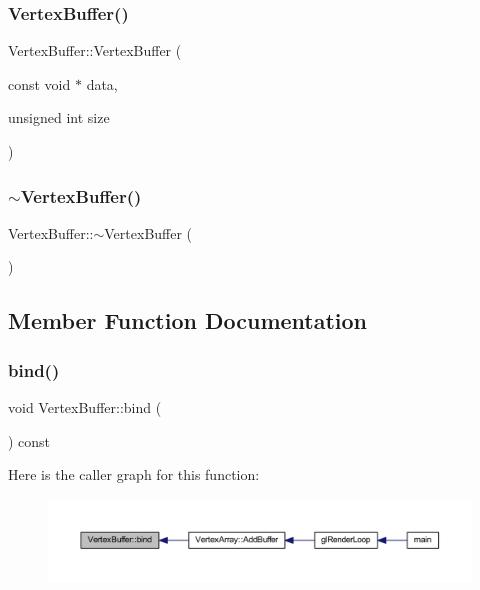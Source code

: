 \subsubsection{\texorpdfstring{Vertex\+Buffer()}{VertexBuffer()}}
{\footnotesize\ttfamily Vertex\+Buffer\+::\+Vertex\+Buffer (\begin{DoxyParamCaption}\item[{const void $\ast$}]{data,  }\item[{unsigned int}]{size }\end{DoxyParamCaption})}

\mbox{\label{class_vertex_buffer_a5216726fdd43b2ae8e1439e347717fdd}} 
\subsubsection{\texorpdfstring{$\sim$\+Vertex\+Buffer()}{~VertexBuffer()}}
{\footnotesize\ttfamily Vertex\+Buffer\+::$\sim$\+Vertex\+Buffer (\begin{DoxyParamCaption}{ }\end{DoxyParamCaption})}



\subsection{Member Function Documentation}
\mbox{\label{class_vertex_buffer_afc06aa70b14e2379e8565afb2e017bd2}} 
\subsubsection{\texorpdfstring{bind()}{bind()}}
{\footnotesize\ttfamily void Vertex\+Buffer\+::bind (\begin{DoxyParamCaption}{ }\end{DoxyParamCaption}) const}

Here is the caller graph for this function\+:
\nopagebreak
\begin{figure}[H]
\begin{center}
\leavevmode
\includegraphics[width=350pt]{class_vertex_buffer_afc06aa70b14e2379e8565afb2e017bd2_icgraph}
\end{center}
\end{figure}
\mbox{\label{class_vertex_buffer_a85fad27f8f068b0610ff052a2a5496f1}} 
